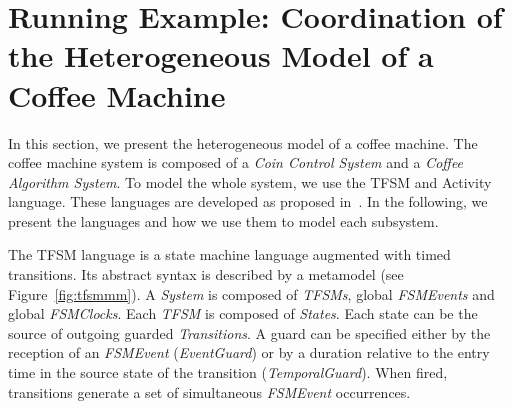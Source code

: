 \section{Running Example: Coordination of the Heterogeneous Model of a Coffee Machine}
\label{sec:runningexample}
In this section, we present the heterogeneous model of a coffee machine. The coffee machine system is composed of a \emph{Coin Control System} and a \emph{Coffee Algorithm System}. To model the whole system, we use the TFSM and Activity language. These languages are developed as proposed in~\cite{sle13-combemale}. In the following, we present the languages and how we use them to model each subsystem. %


The TFSM language is a state machine language augmented with timed transitions. Its abstract syntax is described by a metamodel (see Figure~\ref{fig:tfsmmm}). A \emph{System} is composed of \emph{TFSMs}, global \emph{FSMEvents} and global \emph{FSMClocks}. Each \emph{TFSM} is composed of \emph{States}. Each state can be the source of outgoing guarded \emph{Transitions}. A guard can be specified either by the reception of an \emph{FSMEvent} (\emph{EventGuard}) or by a duration relative to the entry time in the source state of the transition (\emph{TemporalGuard}). When fired, transitions generate a set of simultaneous \emph{FSMEvent} occurrences.
	
